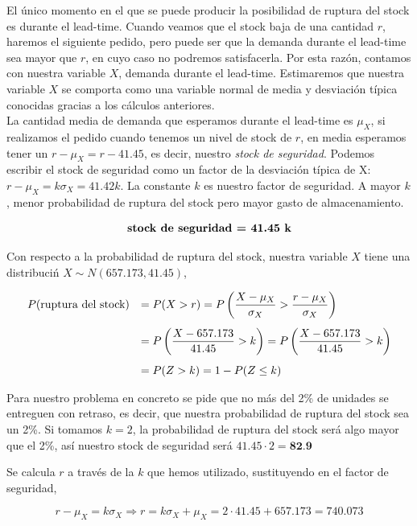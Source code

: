 \documentclass[a4paper,12pt]{article}
\begin{document}
\begin{itemize}
El \'unico momento en el que se puede producir la posibilidad de ruptura del stock es durante el lead-time. Cuando veamos que el stock baja de una cantidad $r$, haremos el siguiente pedido, pero puede ser que la demanda durante el lead-time sea mayor que $r$, en cuyo caso no podremos satisfacerla. Por esta raz\'on, contamos con nuestra variable $X$, demanda durante el lead-time. Estimaremos que nuestra variable $X$ se comporta como una variable normal de media y desviaci\'on t\'ipica conocidas gracias a los c\'alculos anteriores.\\

La cantidad media de demanda que esperamos durante el lead-time es $\mu_X$, si realizamos el pedido cuando tenemos un nivel de stock de $r$, en media esperamos tener un $r - \mu_X = r - 41.45$, es decir, nuestro \textit{stock de seguridad}. Podemos escribir el stock de seguridad como un factor de la desviaci\'on t\'ipica de X: $r - \mu_X = k\sigma_X =  41.42 k$. La constante $k$ es nuestro factor de seguridad. A mayor $k$, menor probabilidad de ruptura del stock pero mayor gasto de almacenamiento. 

$$ \textbf{\text{stock de seguridad} = 41.45 k}$$

Con respecto a la probabilidad de ruptura del stock, nuestra variable $X$ tiene una distribuci\'n $ X\sim N(657.173, 41.45)$,

\begin{equation*}
\begin{array}{l l}
 P(\text{ruptura del stock}) & =  P(X > r) = P\left(\dfrac{X - \mu_X}{\sigma_X} > \dfrac{r-\mu_X}{\sigma_X}\right) \\[0.5cm]
 \, &   = P\left(\dfrac{X - 657.173}{41.45} > k\right) = P\left(\dfrac{X - 657.173}{41.45} > k\right) \\[0.5cm]
 \, &   = P(Z > k) = 1 - P(Z \leq k)
\end{array}
\end{equation*}

Para nuestro problema en concreto se pide que no m\'as del 2\% de unidades se entreguen con retraso, es decir, que nuestra probabilidad de ruptura del stock sea un 2\%. Si tomamos $k = 2$, la probabilidad de ruptura del stock ser\'a algo mayor que el 2\%, as\'i nuestro stock de seguridad ser\'a $41.45 \cdot 2 = \textbf{82.9}$

Se calcula \textbf{$r$} a trav\'es de la $k$ que hemos utilizado, sustituyendo en el factor de seguridad,

$$ r - \mu_X = k\sigma_X \Rightarrow r = k\sigma_X + \mu_X = 2\cdot 41.45 + 657.173 = 740.073$$


\end{itemize}
\end{document}
